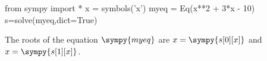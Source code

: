 \documentclass{article}
\begin{document}
\begin{sympycode}
from sympy import *
x = symbols('x')
myeq = Eq(x**2 + 3*x - 10)
s=solve(myeq,dict=True)
\end{sympycode}
The roots of the equation $\sympy{myeq}$
are $x=\sympy{s[0][x]}$ and $x=\sympy{s[1][x]}$.
\end{document}
